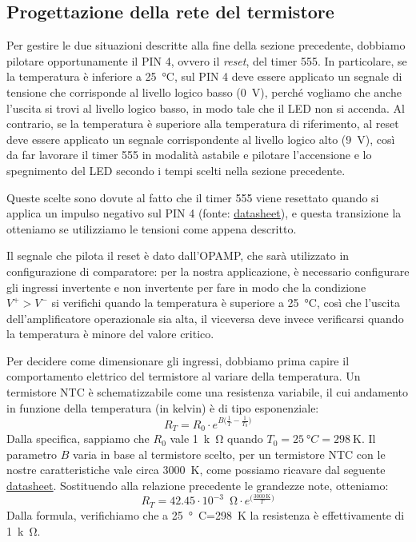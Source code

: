 \documentclass{report}
\begin{document}
\subsection{Progettazione della rete del termistore}\label{rete_termistore}
Per gestire le due situazioni descritte alla fine della sezione precedente, dobbiamo pilotare opportunamente il PIN 4, ovvero il \textit{reset}, del timer 555. In particolare, se la temperatura è inferiore a \SI{25}{\degree}C, sul PIN 4 deve essere applicato un segnale di tensione che corrisponde al livello logico basso (\SI{0}{\volt}), perché vogliamo che anche l'uscita si trovi al livello logico basso,  in modo tale che il LED non si accenda. Al contrario, se la temperatura è superiore alla temperatura di riferimento, al reset deve essere applicato un segnale corrispondente al livello logico alto (\SI{9}{\volt}), così da far lavorare il timer 555 in modalità astabile e pilotare l'accensione e lo spegnimento del LED secondo i tempi scelti nella sezione precedente. \par
\noindent Queste scelte sono dovute al fatto che il timer 555 viene resettato quando si applica un impulso negativo sul PIN 4 (fonte: \textcolor{blue}{\underline{\href{https://www.ti.com/lit/ds/symlink/lm555.pdf?ts=1667144089940&ref_url=https\%253A\%252F\%252Fwww.ti.com\%252Fproduct\%252FLM555}{datasheet}}}), e questa transizione la otteniamo se utilizziamo le tensioni come appena descritto. \par
Il segnale che pilota il reset è dato dall'OPAMP, che sarà utilizzato in configurazione di comparatore: per la nostra applicazione, è necessario configurare gli ingressi invertente e non invertente per fare in modo che la condizione $V^+>V^-$ si verifichi quando la temperatura è superiore a \SI{25}{\degree}C, così che l'uscita dell'amplificatore operazionale sia alta, il viceversa deve invece verificarsi quando la temperatura è minore del valore critico. \par
Per decidere come dimensionare gli ingressi, dobbiamo prima capire il comportamento elettrico del termistore al variare della temperatura. Un termistore NTC è schematizzabile come una resistenza variabile, il cui andamento in funzione della temperatura (in kelvin) è di tipo esponenziale:
$$ R_T = R_0\cdot e^{B\bigl(\frac{1}{T}-\frac{1}{T_0}\bigr)}$$
Dalla specifica, sappiamo che $R_0$ vale \SI{1}{k\ohm} quando $T_0 = \SI{25}{\degree C}=\SI{298}{\kelvin}$. Il parametro $B$ varia in base al termistore scelto, per un termistore NTC con le nostre caratteristiche vale circa \SI{3000}{\kelvin}, come possiamo ricavare dal seguente \textcolor{blue}{\underline{\href{https://www.mouser.it/datasheet/2/240/Littelfuse_Leaded_Thermistors_Glass_Encapsulated_T-1315924.pdf}{datasheet}}}. Sostituendo alla relazione precedente le grandezze note, otteniamo:
$$R_T = 42.45\cdot 10^{-3}\;\SI{}{\ohm}\cdot e^{\bigl(\frac{\SI{3000}{\kelvin}}{T}\bigr)} $$
Dalla formula, verifichiamo che a \SI{25}{\degree C}=\SI{298}{\kelvin} la resistenza è effettivamente di \SI{1}{k\ohm}.
\end{document}
